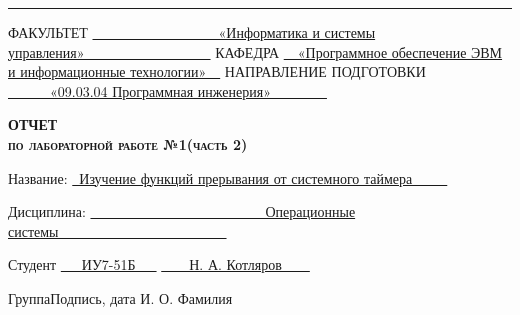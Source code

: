 \begin{titlepage}
\noindent\rule{18cm}{1.5pt}

\vspace{8mm}

\noindent\textnormal{ФАКУЛЬТЕТ}\hspace{5mm} \underline{\textnormal{~~~~~~~~~~~~~~~~~~«Информатика и системы управления»~~~~~~~~~~~~~~~~~~}} \newline\newline
\textnormal{КАФЕДРА}\hspace{5mm} \underline{\textnormal{~~«Программное обеспечение ЭВМ и информационные технологии»~~}}
\newline\newline
\textnormal{НАПРАВЛЕНИЕ ПОДГОТОВКИ}\hspace{5mm} \underline{\textnormal{~~~~~~«09.03.04 Программная инженерия»~~~~~~~~}}

\vspace{2.5cm}

\begin{center}
	\Large\textbf{\textsc{ОТЧЕТ}}\\
	\Large\textbf{\textsc{по лабораторной работе №1(часть 2)}}\\
\end{center}

\vspace{1cm}

\noindent\textnormal{Название:} \hspace{15mm} \underline{\textnormal{~Изучение функций прерывания от системного таймера~~~~~}}\noindent

\vspace{1.3cm}

\noindent\textnormal{Дисциплина:} \hspace{10mm} \underline{\textnormal{~~~~~~~~~~~~~~~~~~~~~~~~~Операционные системы~~~~~~~~~~~~~~~~~~~~~~~~}}\noindent

\vspace{2cm}

\noindent\textnormal{Студент} \hspace{17mm}
\underline{\textnormal{{~~~ИУ7-51Б~~~}}}
\hspace{20mm}
\underline{\textnormal{\hphantom{~~~~~~~~~~~~~~~~~~~~~~~~~~~}}} \hspace{15mm}
\underline{\textnormal{~~~~Н. А. Котляров~~~~}}

\vspace{2mm}
\noindent\textnormal{\hphantom{Студент}} \hspace{23mm}\noindent
\fontsize{8pt}{8pt}
\textnormal{Группа}\hspace{40mm}\textnormal{Подпись, дата} \hspace{30mm}\noindent\textnormal{И. О. Фамилия}


\end{titlepage}
